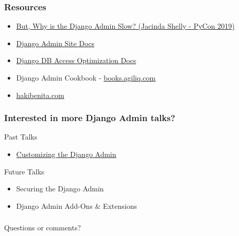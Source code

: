 \documentclass[aspectratio=169]{beamer}
\begin{document}
\begin{frame}
\frametitle{Resources}
  \begin{itemize}
    \item {\small \href{https://www.youtube.com/watch?v=f8cFjiyxQuQ}{But, Why is the Django Admin Slow? (Jacinda Shelly - PyCon 2019)}}
    \item {\small \href{https://docs.djangoproject.com/en/2.2/ref/contrib/admin/}{Django Admin Site Docs}}
    \item {\small \href{https://docs.djangoproject.com/en/2.2/topics/db/optimization/}{Django DB Access Optimization Docs}}
    \item {\small Django Admin Cookbook - \href{https://books.agiliq.com/projects/django-admin-cookbook}{books.agiliq.com}}
    \item {\small \href{https://hakibenita.com/tag/django-admin}{hakibenita.com}}
  \end{itemize}
\end{frame}


\begin{frame}
\frametitle{Interested in more Django Admin talks?}
  Past Talks
  \begin{itemize}
    \item {\small \href{https://github.com/davidfischer/talk-customizing-django-admin}{Customizing the Django Admin}}
  \end{itemize}

  \vfill

  Future Talks
  \begin{itemize}
    \item {\small Securing the Django Admin}
    \item {\small Django Admin Add-Ons \& Extensions}
  \end{itemize}
\end{frame}


\begin{frame}
\frametitle{}
  {\huge Questions or comments?}
\end{frame}
\end{document}
